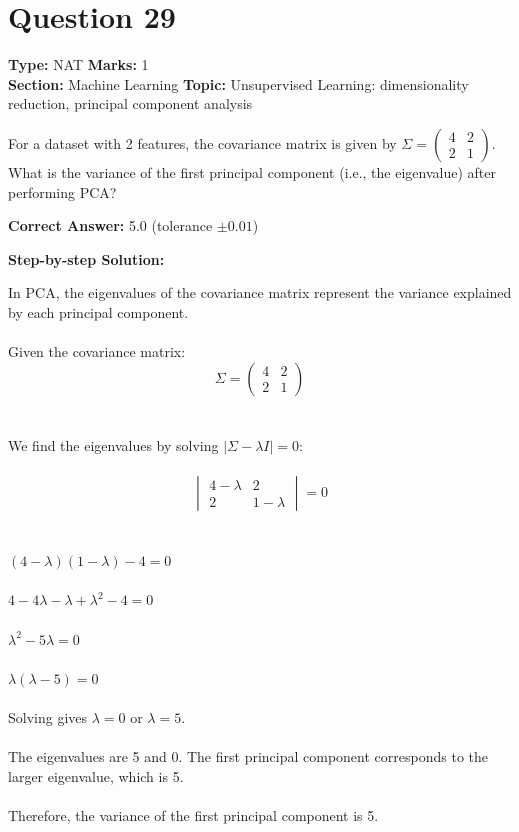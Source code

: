 \documentclass[11pt]{article}
\begin{document}
\section*{Question 29}
\textbf{Type:} NAT \hfill \textbf{Marks:} 1\\
\textbf{Section:} Machine Learning \hfill \textbf{Topic:} Unsupervised Learning: dimensionality reduction, principal component analysis

For a dataset with 2 features, the covariance matrix is given by \(\Sigma = \begin{pmatrix} 4 & 2 \\ 2 & 1 \end{pmatrix}\). What is the variance of the first principal component (i.e., the eigenvalue) after performing PCA?



\textbf{Correct Answer:} 5.0 (tolerance \(\pm 0.01\))

\textbf{Step-by-step Solution:}

In PCA, the eigenvalues of the covariance matrix represent the variance explained by each principal component.\\
\\
Given the covariance matrix:\\
\[\Sigma = \begin{pmatrix} 4 & 2 \\ 2 & 1 \end{pmatrix}\]\\
\\
We find the eigenvalues by solving \(|\Sigma - \lambda I| = 0\):\\
\\
\[\begin{vmatrix} 4-\lambda & 2 \\ 2 & 1-\lambda \end{vmatrix} = 0\]\\
\\
\((4-\lambda)(1-\lambda) - 4 = 0\)\\
\\
\(4 - 4\lambda - \lambda + \lambda^2 - 4 = 0\)\\
\\
\(\lambda^2 - 5\lambda = 0\)\\
\\
\(\lambda(\lambda - 5) = 0\)\\
\\
Solving gives \(\lambda = 0\) or \(\lambda = 5\).\\
\\
The eigenvalues are 5 and 0. The first principal component corresponds to the larger eigenvalue, which is 5.\\
\\
Therefore, the variance of the first principal component is 5.
\end{document}
